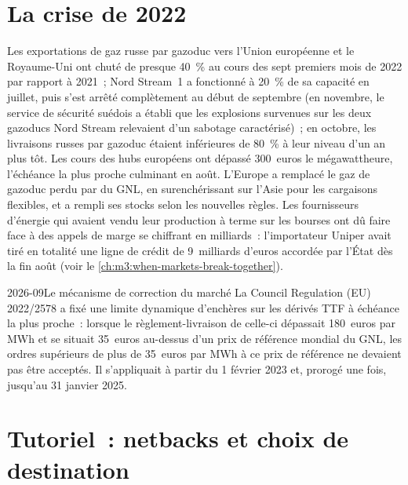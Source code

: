 \section{La crise de 2022}

Les exportations de gaz russe par gazoduc vers l'Union européenne et le Royaume-Uni ont chuté de presque
40~\% au cours des sept premiers mois de 2022 par rapport à 2021~; Nord Stream~1 a fonctionné à 20~\% de sa
capacité en juillet, puis s'est arrêté complètement au début de septembre (en novembre, le service de sécurité suédois
a établi que les explosions survenues sur les deux gazoducs Nord Stream relevaient d'un sabotage caractérisé)~; en octobre,
les livraisons russes par gazoduc étaient inférieures de 80~\% à leur niveau d'un an plus tôt. Les cours des hubs européens ont dépassé 300~euros le mégawattheure, l'échéance la plus proche culminant en août.
L'Europe a remplacé le gaz de gazoduc perdu par du GNL, en surenchérissant sur l'Asie pour les cargaisons flexibles,
et a rempli ses stocks selon les nouvelles règles. Les fournisseurs d'énergie qui avaient vendu leur production à terme sur les bourses ont dû faire face à des appels de marge se chiffrant en milliards~:
l'importateur Uniper avait tiré en totalité une ligne de crédit de 9~milliards d'euros accordée par l'État dès la fin août
(voir le \cref{ch:m3:when-markets-break-together}).

\begin{dated}{2026-09}{Le mécanisme de correction du marché}\label{dat:m3:natural-gas-and-lng:mcm}
La Council Regulation (EU) 2022/2578 a fixé une limite dynamique d'enchères sur les dérivés TTF
à échéance la plus proche~: lorsque le règlement-livraison de celle-ci dépassait 180~euros par MWh et se situait 35~euros au-dessus
d'un prix de référence mondial du GNL, les ordres supérieurs de plus de 35~euros par MWh à ce prix de référence ne devaient pas être
acceptés. Il s'appliquait à partir du 1 février 2023 et, prorogé une fois, jusqu'au 31 janvier 2025.
\end{dated}

\section{Tutoriel~: netbacks et choix de destination}\label{tut:m3:natural-gas-and-lng:netback}

